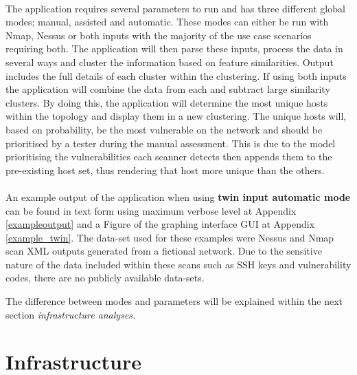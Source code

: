\paragraph{}The application requires several parameters to run and has three different global modes; manual, assisted and automatic. These modes can either be run with Nmap, Nessus or both inputs with the majority of the use case scenarios requiring both. The application will then parse these inputs, process the data in several ways and cluster the information based on feature similarities. Output includes the full details of each cluster within the clustering. If using both inputs the application will combine the data from each and subtract large similarity clusters. By doing this, the application will determine the most unique hosts within the topology and display them in a new clustering. The unique hosts will, based on probability, be the most vulnerable on the network and should be prioritised by a tester during the manual assessment. This is due to the model prioritising the vulnerabilities each scanner detects then appends them to the pre-existing host set, thus rendering that host more unique than the others.

\paragraph{}An example output of the application when using \textbf{twin input automatic mode} can be found in text form using maximum verbose level at Appendix \ref{exampleoutput} and a Figure of the graphing interface GUI at Appendix \ref{example_twin}. The data-set used for these examples were Nessus and Nmap scan XML outputs generated from a fictional network. Due to the sensitive nature of the data included within these scans such as SSH keys and vulnerability codes, there are no publicly available data-sets.\linebreak

The difference between modes and parameters will be explained within the next section \textit{infrastructure analyses.}

\section{Infrastructure}
\label{sec:infrastructure}

